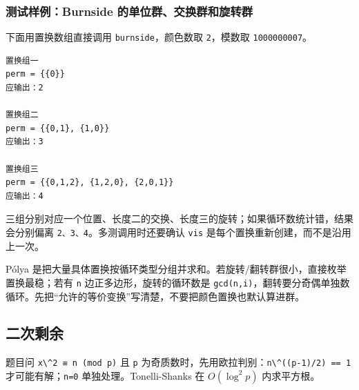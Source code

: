 \subsubsection{测试样例：Burnside 的单位群、交换群和旋转群}

下面用置换数组直接调用 \passthrough{\lstinline!burnside!}，颜色数取 \passthrough{\lstinline!2!}，模数取 \passthrough{\lstinline!1000000007!}。

\begin{lstlisting}
置换组一
perm = {{0}}
应输出：2

置换组二
perm = {{0,1}, {1,0}}
应输出：3

置换组三
perm = {{0,1,2}, {1,2,0}, {2,0,1}}
应输出：4
\end{lstlisting}

三组分别对应一个位置、长度二的交换、长度三的旋转；如果循环数统计错，结果会分别偏离 \passthrough{\lstinline!2、3、4!}。多测调用时还要确认 \passthrough{\lstinline!vis!} 是每个置换重新创建，而不是沿用上一次。

Pólya 是把大量具体置换按循环类型分组并求和。若旋转/翻转群很小，直接枚举置换最稳；若有 \passthrough{\lstinline!n!} 边正多边形，旋转的循环数是 \passthrough{\lstinline!gcd(n,i)!}，翻转要分奇偶单独数循环。先把``允许的等价变换''写清楚，不要把颜色置换也默认算进群。


\subsection{二次剩余}

题目问 \passthrough{\lstinline!x\^2 ≡ n (mod p)!} 且 \passthrough{\lstinline!p!} 为奇质数时，先用欧拉判别：\passthrough{\lstinline!n\^((p-1)/2) == 1!} 才可能有解；\passthrough{\lstinline!n=0!} 单独处理。Tonelli-Shanks 在 \(O(\log^2 p)\) 内求平方根。

